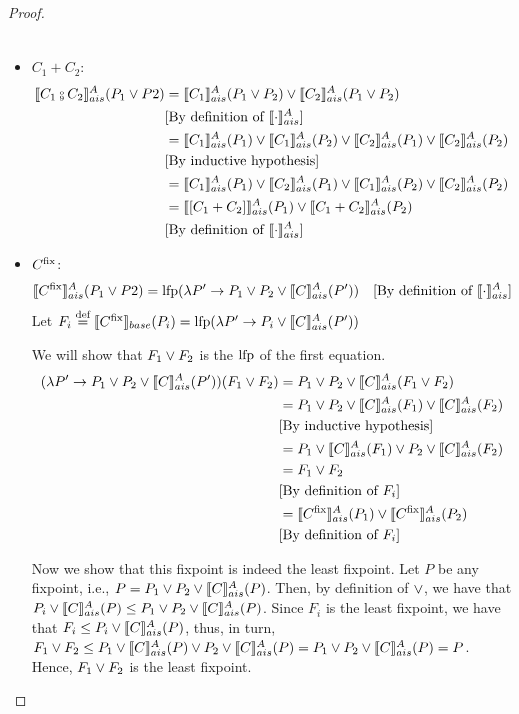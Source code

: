 \documentclass[
  10pt,       %
  twoside,    %
  a4paper,    %
  english,    %
  tikz,       %
  openright,  %
]{book}
\begin{document}
\begin{proof}
\begin{itemize}
\begin{align*}
      \end{align*}
    \item $C_1 + C_2$:
      \begin{align*}
        \asem{C_1 \fcmp C_2}(P_1 \join P2)
          &= \asem{C_1}(P_1 \join P_2) \join \asem{C_2}(P_1 \join P_2) \\
          &\text{[By definition of $\asem{\cdot}$]} \\
          &= \asem{C_1}(P_1) \join \asem{C_1}(P_2) \join \asem{C_2}(P_1)
            \join \asem{C_2}(P_2) \\
          &\text{[By inductive hypothesis]} \\
          &= \asem{C_1}(P_1) \join \asem{C_2}(P_1) \join \asem{C_1}(P_2)
            \join \asem{C_2}(P_2) \\
          &= \asem{[C_1 + C_2]}(P_1) \join \asem{C_1 + C_2}(P_2) \\
          &\text{[By definition of $\asem{\cdot}$]} \\
      \end{align*}
    \item $C^{\mathrm{fix}}$:
      \begin{align*}
        \llbracket C^{\mathrm{fix}} \rrbracket_{ais}^{A}(P_1 \lor P2)
          &= \mathrm{lfp}(\lambda P' \to P_1 \lor P_2 \lor \llbracket C \rrbracket_{ais}^{A}(P'))
          &\text{[By definition of $\llbracket \cdot \rrbracket_{ais}^{A}$]}
      \end{align*}
      Let $F_i \stackrel{\text{def}}{=} \llbracket C^{\mathrm{fix}} \rrbracket_{base}(P_i) = \mathrm{lfp}(\lambda P' \to P_i \lor 
      \llbracket C \rrbracket_{ais}^{A}(P'))$

      We will show that $F_1 \lor F_2$ is the $\mathrm{lfp}$ of the first equation.
      \begin{align*}
        (\lambda P' \to P_1 \lor P_2 \lor \llbracket C \rrbracket_{ais}^{A}(P'))(F_1 \lor F_2)
          &= P_1 \lor P_2 \lor \llbracket C \rrbracket_{ais}^{A}(F_1 \lor F_2) \\
          &= P_1 \lor P_2 \lor \llbracket C \rrbracket_{ais}^{A}(F_1) \lor \llbracket C \rrbracket_{ais}^{A}(F_2)  \\
          &\text{[By inductive hypothesis]}\\
          &= P_1 \lor \llbracket C \rrbracket_{ais}^{A}(F_1) \lor P_2 \lor \llbracket C \rrbracket_{ais}^{A}(F_2) \\
          &= F_1 \lor F_2 \\
          &\text{[By definition of $F_i$]}\\
          &= \llbracket C^{\mathrm{fix}} \rrbracket_{ais}^{A}(P_1) \lor \llbracket C^{\mathrm{fix}} \rrbracket_{ais}^{A}(P_2) \\
          &\text{[By definition of $F_i$]}\\
      \end{align*}

      Now we show that this fixpoint is indeed the least fixpoint. Let $P$ be any fixpoint, i.e.,
      $P = P_1 \lor P_2 \lor \llbracket C \rrbracket_{ais}^{A}(P)$.
      Then, by definition of $\lor$, we have that $P_i \lor \llbracket C \rrbracket_{ais}^{A}(P) \leq 
      P_1 \lor P_2 \lor \llbracket C \rrbracket_{ais}^{A}(P)$. Since $F_i$ is the least fixpoint, we have that
      $F_i \leq P_i \lor \llbracket C \rrbracket_{ais}^{A}(P)$, thus, in turn,  $F_1 \lor F_2 \leq P_1
      \lor \llbracket C \rrbracket_{ais}^{A}(P) \lor P_2 \lor \llbracket C \rrbracket_{ais}^{A}(P) = P_1 \lor P_2 \lor 
      \llbracket C \rrbracket_{ais}^{A}(P) = P$. Hence, $F_1 \lor F_2$ is the least fixpoint.
  \end{itemize}
\end{proof}
\end{document}
